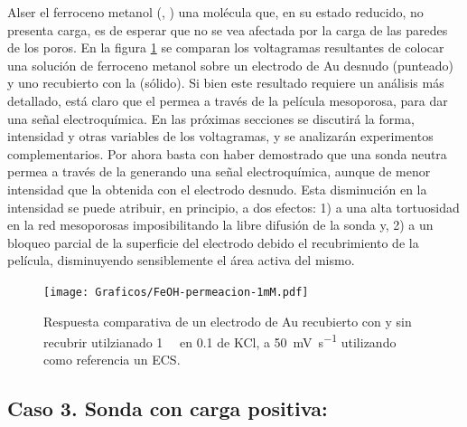 		Al\space ser el ferroceno metanol (\ferroceno, \fc) una molécula que, en su estado reducido, no presenta carga, es de esperar que no se vea afectada por la carga de las paredes de los poros. En la figura \ref{fig:permeacion} se comparan los voltagramas resultantes de colocar una solución de ferroceno metanol sobre un electrodo de Au  desnudo (punteado) y uno recubierto con la \pdm\space (sólido).  Si bien este resultado  requiere un análisis más detallado, está claro que el \fc\space permea a través de la película mesoporosa, para dar una señal electroquímica. En las próximas secciones se discutirá la forma, intensidad y otras variables de los voltagramas, y se analizarán experimentos complementarios. Por ahora basta con haber demostrado que una sonda neutra permea a través de la \pdm\space generando una señal electroquímica, aunque de menor intensidad que la obtenida con el electrodo desnudo. Esta disminución en la intensidad se puede atribuir, en principio, a dos efectos: 1) a una alta tortuosidad en la red mesoporosas imposibilitando la libre difusión de la sonda y\cite{Etienne2007}, 2) a un bloqueo parcial de la superficie del electrodo debido el recubrimiento de la película, disminuyendo sensiblemente el área activa del mismo\cite{Otal2006}.

		\begin{figure}[ht]
				\centering
		 	    \texttt{[image: Graficos/FeOH-permeacion-1mM.pdf]}
		        \caption[Permeación ferroceno metanol en \pdmF]{Respuesta comparativa de un electrodo de Au  recubierto con \pdmF\space y sin recubrir utilzianado \fc\space \SI{1}{\milli\Molar} en \SI{0.1}{\Molar} de KCl, a \SI{50}{\milli\volt\per\second} utilizando como referencia un ECS.}
		        \label{fig:permeacion}
		      	\end{figure}

	\subsection{Caso 3. Sonda con carga positiva: \texorpdfstring{\aminorutenioCompleto}{aminorutenio}}

